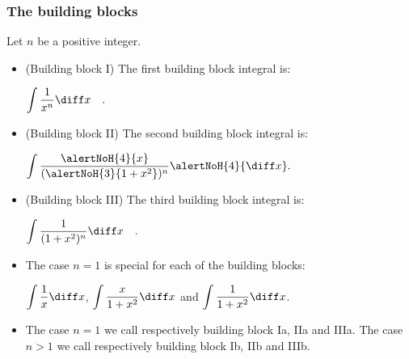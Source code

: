 \begin{frame}
\frametitle{The building blocks}
Let $n$ be a positive integer.
\begin{itemize}
\item (Building block I) The first building block integral is:

$\displaystyle \int \frac{1}{x^n }\diff x\quad .$
\item<2-> (Building block II) The second building block integral is:

$\displaystyle \int \frac{\alertNoH{4}{x}}{(\alertNoH{3}{1+x^2})^n }\alertNoH{4}{\diff x}.$ 
\item<5-> (Building block III) The third building block integral is:

$\displaystyle \int \frac{1}{(1+x^2)^n }\diff x\quad .$
\item<6-> The case $n=1$ is special for each of the building blocks:

$\displaystyle \int \frac{1}{x}\diff x$, $\displaystyle \int \frac{x}{1+x^2 }\diff x$ and $\displaystyle \int \frac{1}{1+x^2 }\diff x$.
\item<7-> The case $n=1$ we call respectively building block Ia, IIa and IIIa.
 {The case $n>1$ we call respectively building block Ib, IIb and IIIb.} 
\end{itemize}

\end{frame}
